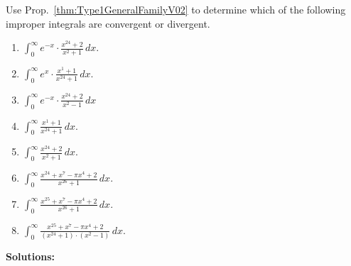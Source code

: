 \bigskip

\begin{example} Use Prop.~\ref{thm:Type1GeneralFamilyV02} to determine which of the following improper integrals are convergent or divergent.
\begin{enumerate}
\renewcommand{\labelenumi}{(\alph{enumi})}
\setlength{\itemsep}{.2cm}
    \item  $\int_0^\infty e^{-x} \cdot \frac{x^{24} + 2}{x^2 + 1} \, dx$.

    \item  $\int_0^\infty e^{x} \cdot \frac{x^1 + 1}{x^{24} + 1} \, dx$.

     \item  $\int_0^\infty e^{-x} \cdot \frac{x^{24} + 2}{x^2 - 1} \, dx$ 

    \item  $\int_0^\infty  \frac{x^1 + 1}{x^{24} + 1} \, dx$.

    \item  $\int_0^\infty  \frac{x^{24} + 2}{x^2 + 1} \, dx$.

    \item  $\int_0^\infty  \frac{x^{24} + x^7 - \pi x^4  + 2}{x^{26} + 1} \, dx$.

    \item  $\int_0^\infty  \frac{x^{25} + x^7 - \pi x^4  + 2}{x^{26} + 1} \, dx$.
    
      \item  $\int_0^\infty  \frac{x^{25} + x^7 - \pi x^4 + 2}{(x^{24} + 1)\cdot (x^2 - 1)} \, dx$.

\end{enumerate}
\end{example}
\textbf{Solutions:}
